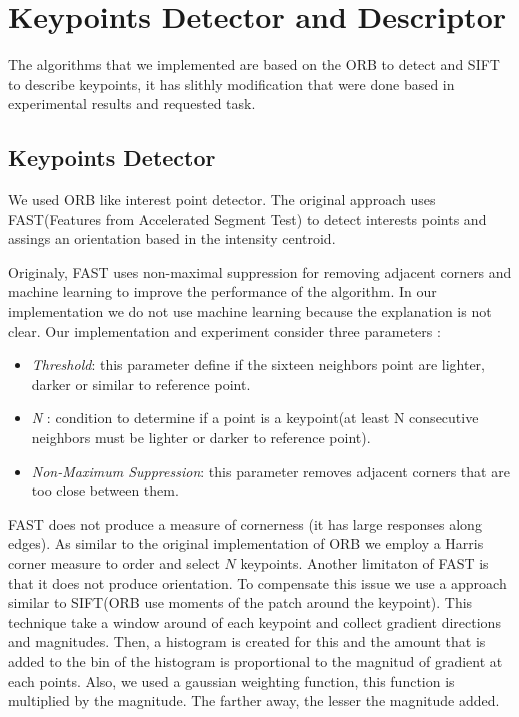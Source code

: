 \section{Keypoints Detector and Descriptor}

The algorithms that we implemented are based on the ORB to detect and SIFT to describe keypoints, it has slithly modification that were done based in experimental results and requested task.

\subsection{Keypoints Detector} 
We used ORB like interest point detector. The original approach uses FAST(Features from Accelerated Segment Test) to detect interests points and assings an orientation based in the intensity centroid. 

Originaly, FAST uses non-maximal suppression for removing adjacent corners and machine learning to improve the performance of the algorithm. In our implementation we do not use machine learning because the explanation is not clear. Our implementation and experiment consider three parameters : 
\begin{itemize}
	\item \textit{Threshold}: this parameter define if the sixteen neighbors point are lighter, darker or similar to reference point.
	\item \textit{N} : condition to determine if a point is a keypoint(at least N consecutive neighbors must be lighter or darker to reference point).
	\item \textit{Non-Maximum Suppression}: this parameter removes adjacent corners that are too close between them.
\end{itemize}

FAST does not produce a measure of cornerness (it has large responses along edges). As similar to the original implementation of ORB we employ a Harris corner measure to order and select $N$ keypoints. Another limitaton of FAST is that it does not produce orientation. To compensate this issue we use a approach similar to SIFT(ORB use moments of the patch around the keypoint). This technique take a window around of each keypoint and collect gradient directions and magnitudes. Then, a histogram is created for this and the amount that is added to the bin of the histogram is proportional to the magnitud of gradient at each points. Also, we used a gaussian weighting function, this function is multiplied by the magnitude. The farther away, the lesser the magnitude added.

